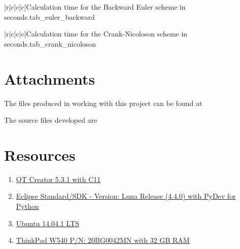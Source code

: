 \documentclass[11pt,english,a4paper]{article}
\begin{document}
\begin{flushleft}
\begin{tabell}{|r|c|c|c|}{\small}{}{}{Calculation time for the Backward Euler scheme in seconds.}{tab_euler_backward}
\end{tabell}

\begin{tabell}{|r|c|c|c|}{\small}{}{}{Calculation time for the Crank-Nicoloson scheme in seconds.}{tab_crank_nicoloson}
\end{tabell}

\section{Attachments}

The files produced in working with this project can be found at \linebreak

The source files developed are


\section{Resources}

\begin{enumerate}
\item{\href{http://qt-project.org/downloads}{QT Creator 5.3.1 with C11}}
\item{\href{https://www.eclipse.org/downloads/}{Eclipse Standard/SDK  - Version: Luna Release (4.4.0) with PyDev for Python}}
\item{\href{http://www.ubuntu.com/download/desktop}{Ubuntu 14.04.1 LTS}}
\item{\href{http://shop.lenovo.com/no/en/laptops/thinkpad/w-series/w540/#tab-reseller}{ThinkPad W540 P/N: 20BG0042MN with 32 GB RAM}}
\end{enumerate}


\end{flushleft}
\end{document}
